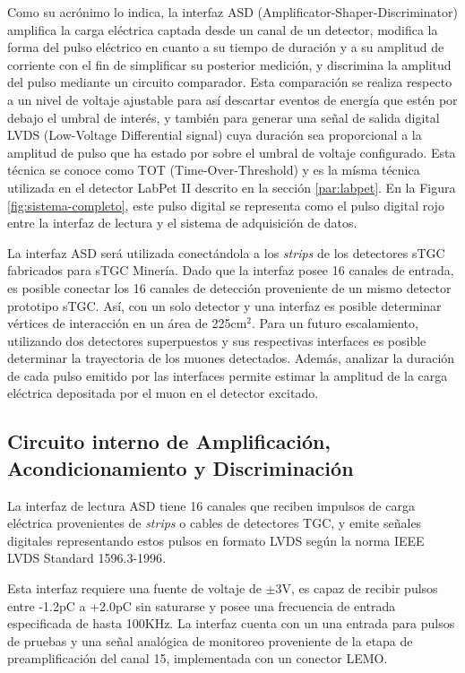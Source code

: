 Como su acrónimo lo indica, la interfaz ASD (Amplificator-Shaper-Discriminator) amplifica la carga eléctrica captada desde un canal de un detector, modifica la forma del pulso eléctrico en cuanto a su tiempo de duración y a su amplitud de corriente con el fin de simplificar su posterior medición, y discrimina la amplitud del pulso mediante un circuito comparador. Esta comparación se realiza respecto a un nivel de voltaje ajustable para así descartar eventos de energía que estén por debajo el umbral de interés, y también para generar una señal de salida digital LVDS (Low-Voltage Differential signal)\cite{1996IEEESociety} cuya duración sea proporcional a la amplitud de pulso que ha estado por sobre el umbral de voltaje configurado. Esta técnica se conoce como TOT (Time-Over-Threshold) y es la mísma técnica utilizada en el detector LabPet II descrito en la sección \ref{par:labpet}.  En la Figura \ref{fig:sistema-completo}, este pulso digital se representa como el pulso digital rojo entre la interfaz de lectura y el sistema de adquisición de datos.
        
La interfaz ASD será utilizada conectándola a los \textit{strips} de los detectores sTGC fabricados para sTGC Minería. Dado que la interfaz posee 16 canales de entrada, es posible conectar los 16 canales de detección proveniente de un mismo detector prototipo sTGC. Así, con un solo detector y una interfaz es posible determinar vértices de interacción en un área de 225cm$^2$. Para un futuro escalamiento, utilizando dos detectores superpuestos y sus respectivas interfaces es posible determinar la trayectoria de los muones detectados. Además, analizar la duración de cada pulso emitido por las interfaces permite estimar la amplitud de la carga eléctrica depositada por el muon en el detector excitado.


\subsection{Circuito interno de Amplificación, Acondicionamiento y Discriminación}
La interfaz de lectura ASD tiene 16 canales que reciben impulsos de carga eléctrica provenientes de \textit{strips} o cables de detectores TGC, y emite señales digitales representando estos pulsos en formato LVDS según la norma IEEE LVDS Standard 1596.3-1996\cite{1996IEEESociety}.

Esta interfaz requiere una fuente de voltaje de $\pm$3V\cite{1999ATLASICs}, es capaz de recibir pulsos entre -1.2pC a +2.0pC sin saturarse y posee una frecuencia de entrada especificada de hasta 100KHz. La interfaz cuenta con un una entrada para pulsos de pruebas y una señal analógica de monitoreo proveniente de la etapa de preamplificación del canal 15, implementada con un conector LEMO.

